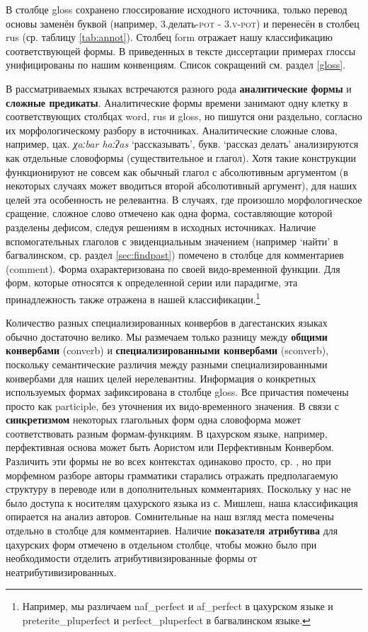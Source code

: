 В столбце gloss сохранено глоссирование исходного источника, только перевод основы заменён буквой (например, 3.делать-\textsc{pot} - \textsc{3.v-pot}) и перенесён в столбец rus (ср. таблицу \ref{tab:annot}). Столбец form отражает нашу классификацию соответствующей формы. В приведенных в тексте диссертации примерах глоссы унифицированы по нашим конвенциям. Список сокращений см. раздел {\ref{gloss}}. 
\par В рассматриваемых языках встречаются разного рода \textbf{аналитические формы} и \textbf{сложные предикаты}. Аналитические формы времени занимают одну клетку в соответствующих столбцах word, rus и gloss, но пишутся они раздельно, согласно их морфологическому разбору в источниках. Аналитические сложные слова, например, цах. \textit{χaːbar haːʔas} `рассказывать', букв. `рассказ делать' анализируются как отдельные словоформы (существительное и глагол). Хотя такие конструкции функционируют не совсем как обычный глагол с абсолютивным аргументом (в некоторых случаях может вводиться второй абсолютивный аргумент), для наших целей эта особенность не релевантна. В случаях, где произошло морфологическое сращение, сложное слово отмечено как одна форма, составляющие которой разделены дефисом, следуя решениям в исходных источниках. Наличие вспомогательных глаголов с эвиденциальным значением (например `найти' в багвалинском, ср. раздел \ref{sec:findpast}) помечено в столбце для комментариев (comment). Форма охарактеризована по своей видо-временной функции. Для форм, которые относятся к определенной серии или парадигме, эта принадлежность также отражена в нашей классификации.\footnote{Например, мы различаем naf\_perfect и af\_perfect в цахурском языке и preterite\_pluperfect и perfect\_pluperfect в багвалинском языке.}
\par Количество разных специализированных конвербов в дагестанских языках обычно достаточно велико. Мы размечаем только разницу между \textbf{общими конвербами} (converb) и \textbf{специализированными конвербами} (sconverb), поскольку семантические различия между разными специализированными конвербами для наших целей нерелевантны. Информация о конкретных используемых формах зафиксирована в столбце gloss. Все причастия помечены просто как participle, без уточнения их видо-временного значения. В связи с \textbf{синкретизмом} некоторых глагольных форм одна словоформа может соответствовать разным формам-функциям. В цахурском языке, например, перфективная основа может быть Аористом или Перфективным Конвербом. Различить эти формы не во всех контекстах одинаково просто, ср. \citep{kazenintestelets2004}, но при морфемном разборе авторы грамматики старались отражать предполагаемую структуру в переводе или в дополнительных комментариях. Поскольку у нас не было доступа к носителям цахурского языка из с. Мишлеш, наша классификация опирается на анализ авторов. Сомнительные на наш взгляд места помечены отдельно в столбце для комментариев. Наличие \textbf{показателя атрибутива} для цахурских форм отмечено в отдельном столбце, чтобы можно было при необходимости отделить атрибутивизированные формы от неатрибутивизированных.
